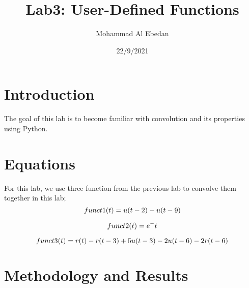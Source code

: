 \documentclass[11pt,a4]{article}
\title{Lab3: User-Defined Functions}
\author{Mohammad Al Ebedan}
\date{22/9/2021}
\begin{document}
	\section{Introduction}
	
	The goal of this lab is to become familiar with convolution and its properties using Python. 

	\section{Equations}
	
	For this lab, we use three function from the previous lab to convolve them together in this lab;
	\begin{equation}
		funct1(t) = u(t - 2) - u(t - 9)\\
	\end{equation}
	
	\begin{equation}
		funct2(t) = e^-t\\
	\end{equation}
	
	\begin{equation}
		funct3(t) = r(t) - r(t-3) + 5u(t-3) - 2u(t-6) - 2r(t-6)\\
	\end{equation}
	
	
	
	
	\section{Methodology and Results}
	
\end{document}
